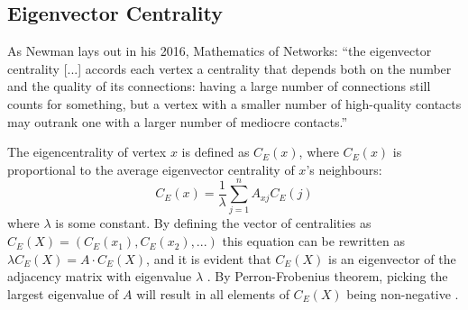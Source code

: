 \subsection{Eigenvector Centrality}\label{sec:EigCentrality}

As Newman lays out in his 2016, Mathematics of Networks: ``the eigenvector
centrality [...] accords each vertex a centrality that depends both on the
number and the quality of its connections: having a large number of connections
still counts for something, but a vertex with a smaller number of high-quality
contacts may outrank one with a larger number of mediocre contacts.''
\cite{newman2008mathematics}

The eigencentrality of vertex $x$ is defined as $C_{E}(x)$, where $C_{E}(x)$ is
proportional to the average eigenvector centrality of $x$'s neighbours:
\begin{equation}
    C_{E}(x)=\frac{1}{\lambda}\sum_{j=1}^{n}A_{xj}C_{E}(j)
\end{equation}
where $\lambda$ is some constant. By defining the vector of centralities as
$C_E(X) = (C_E(x_1),C_E(x_2),...)$ this equation can be rewritten as 
$\lambda C_E(X) = A \cdot C_E(X)$, and it is evident that $C_E(X)$ is an eigenvector of the
adjacency matrix with eigenvalue $\lambda$ \cite{newman2008mathematics}. By
Perron-Frobenius theorem, picking the largest eigenvalue of $A$ will result in
all elements of $C_E(X)$ being non-negative \cite{newman2008mathematics}.